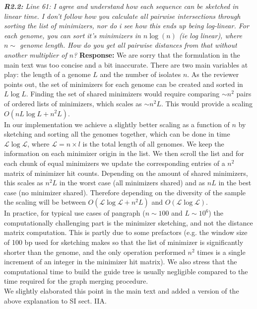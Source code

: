 \documentclass[aps,rmp,onecolumn]{revtex4-1}
\newcommand{\reviewer}[2]{{\it \textbf{#1:} #2\vskip 5mm}}
\newcommand{\response}[1]{{{\color{response}\textbf{Response:} #1}}\vskip 5mm}
\newcommand{\SIalgo}{II}
\begin{document}
\reviewer{R2.2}{Line 61: I agree and understand how each sequence can be sketched in linear time. I don't follow how you calculate all pairwise intersections through sorting the list of minimizers, nor do i see how this ends up being log-linear. For each genome, you can sort it's minimizers in $n \log (n)$ (ie log linear), where $n \sim$ genome length. How do you get all pairwise distances from that without another multiplier of $n$?}
\response{ We are sorry that the formulation in the main text was too concise and a bit inaccurate.
There are two main variables at play: the length of a genome $L$ and the number of isolates $n$. 
As the reviewer points out, the set of minimizers for each genome can be created and sorted in $L \log L$. 
Finding the set of shared minimizers would require comparing $\sim n^2$ pairs of ordered lists of minimizers, which scales as $\sim n^2 L$. This would provide a scaling $O(n L \log L + n^2 L)$.\\
In our implementation we achieve a slightly better scaling as a function of $n$ by sketching and sorting all the genomes together, which can be done in time $\mathcal{L} \log \mathcal{L}$, where $\mathcal{L}= n \times l$ is the total length of all genomes. 
We keep the information on each minimizer origin in the list. We then scroll the list and for each chunk of equal minimizers we update the corresponding entries of a $n^2$ matrix of minimizer hit counts. 
Depending on the amount of shared minimizers, this scales as $n^2 L$ in the worst case (all minimizers shared) and as $n L$ in the best case (no minimizer shared). 
Therefore depending on the diversity of the sample the scaling will be between $O(\mathcal{L} \log \mathcal{L} + n^2 L)$ and $O(\mathcal{L} \log \mathcal{L})$.\\
In practice, for typical use cases of pangraph ($n \sim 100$ and $L \sim 10^6$) the computationally challenging part is the minimizer sketching, and not the distance matrix computation. This is partly due to some prefactors (e.g. the window size of 100 bp used for sketching makes so that the list of minimizer is significantly shorter than the genome, and the only operation performed $n^2$ times is a single increment of an integer in the minimizer hit matrix). We also stress that the computational time to build the guide tree is usually negligible compared to the time required for the graph merging procedure.\\
We slightly elaborated this point in the main text and added a version of the above explanation to SI sect. {\SIalgo}A.
}
\end{document}
